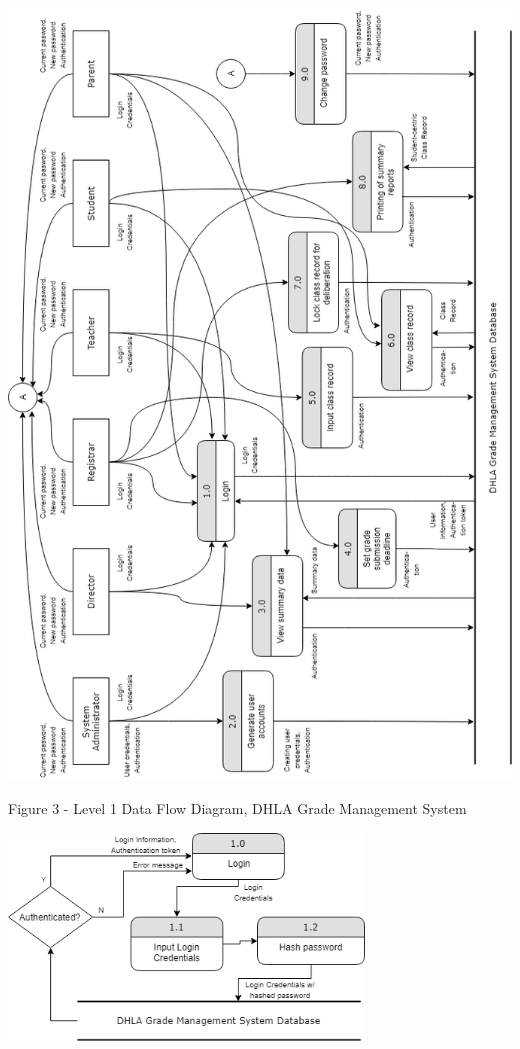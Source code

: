 \documentclass[11pt,a4paper,titlepage]{article}
\begin{document}
\begin{center}
\includegraphics[height=20.5cm]{Data-Flow-Diagram-2.png}
\end{center}
\vspace{2cm}
\begin{center}
    Figure 3 - Level 1 Data Flow Diagram, DHLA Grade Management System
\end{center}
\vspace{2cm}
\begin{center}
\includegraphics[height=5.5cm]{Subexplotion-1.png}
\end{center}
\end{document}
